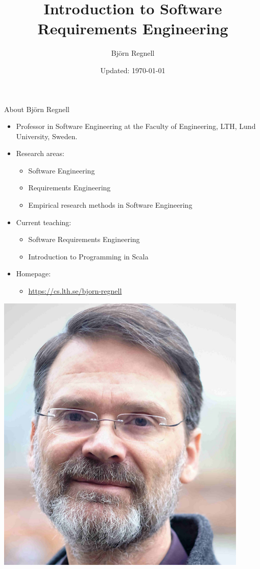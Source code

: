 \documentclass{beamer}
\author{Björn Regnell}
\title{Introduction to Software\\Requirements Engineering}
\date{\footnotesize Updated: \today}
\begin{document}
\maketitle


\begin{frame}[fragile]{About Björn Regnell}
\begin{minipage}[t][1.0\textheight]{0.78\textwidth}
\vspace{0pt}
\begin{itemize}
\item Professor in Software Engineering at the Faculty of Engineering, LTH, Lund University, Sweden.
\item Research areas: 
\begin{itemize}
\item Software Engineering
\item Requirements Engineering 
\item Empirical research methods in Software Engineering 
\end{itemize}
\item Current teaching: 
\begin{itemize}
\item Software Requirements Engineering
\item Introduction to Programming in Scala 
\end{itemize}
\item Homepage: 
\begin{itemize}
\item \url{https://cs.lth.se/bjorn-regnell}
\end{itemize}
\end{itemize}
\end{minipage}%
\hspace*{1em}\begin{minipage}[t][1.0\textheight]{0.22\textwidth}
\vspace{0pt}\hfill\includegraphics[width=0.9\textwidth]{img/bjorn-regnell}

\end{minipage}
\end{frame}
\end{document}
